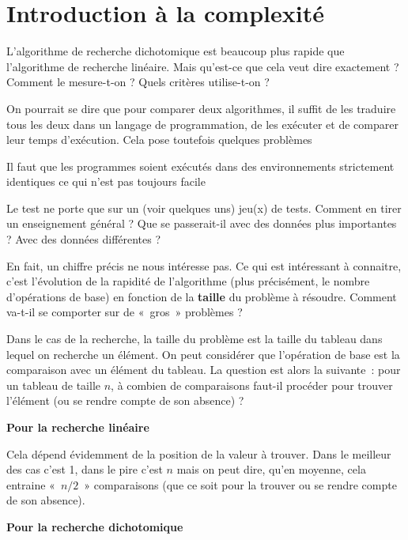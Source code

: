 \section{Introduction à la complexité}

	L’algorithme de recherche dichotomique est beaucoup plus rapide que
	l’algorithme de recherche linéaire. Mais qu’est-ce que cela veut dire
	exactement ? Comment le mesure-t-on ? Quels critères utilise-t-on ?

	On pourrait se dire que pour comparer deux algorithmes, il suffit de les
	traduire tous les deux dans un langage de programmation, de les
	exécuter et de comparer leur temps d’exécution. Cela pose toutefois
	quelques problèmes
			
	\liststyleListv
	\begin{liste}
		\item 
			Il faut que les programmes soient exécutés dans des environnements
			strictement identiques ce qui n’est pas toujours facile
		\item 
			Le test ne porte que sur un (voir quelques uns) jeu(x) de tests. Comment
			en tirer un enseignement général ? Que se passerait-il avec des données
			plus importantes ? Avec des données différentes ?
	\end{liste}
	
	En fait, un chiffre précis ne nous intéresse pas. Ce qui est intéressant
	à connaitre, c’est l’évolution de la rapidité de l’algorithme (plus
	précisément, le nombre d’opérations de base) en fonction de la
	\textbf{taille} du problème à résoudre. Comment va-t-il se comporter
	sur de «~gros~» problèmes ?

	Dans le cas de la recherche, la taille du problème est la taille du
	tableau dans lequel on recherche un élément. On peut considérer que
	l’opération de base est la comparaison avec un élément du tableau. La
	question est alors la suivante~: pour un tableau de taille $n$, à combien
	de comparaisons faut-il procéder pour trouver l’élément (ou se rendre
	compte de son absence) ?

	{\bfseries
	Pour la recherche linéaire}

		Cela dépend évidemment de la position de la valeur à trouver. Dans le
		meilleur des cas c’est 1, dans le pire c’est $n$ mais on peut dire, qu’en
		moyenne, cela entraine «~$n/2$~» comparaisons (que ce soit pour la
		trouver ou se rendre compte de son absence).

	{\bfseries
	Pour la recherche dichotomique}

